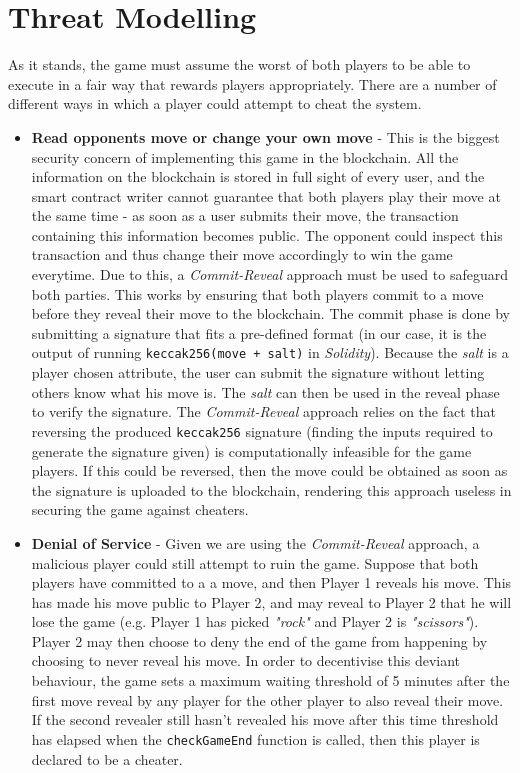 \documentclass[a4paper, twoside]{article}
\begin{document}
\section{Threat Modelling}

As it stands, the game must assume the worst of both players to be able to execute in a fair way that rewards players appropriately. There are a number of different ways in which a player could attempt to cheat the system.

\begin{itemize}
	\item \textbf{Read opponents move or change your own move} - This is the biggest security concern of implementing this game in the blockchain. All the information on the blockchain is stored in full sight of every user, and the smart contract writer cannot guarantee that both players play their move at the same time - as soon as a user submits their move, the transaction containing this information becomes public. The opponent could inspect this transaction and thus change their move accordingly to win the game everytime. Due to this, a \textit{Commit-Reveal} approach must be used to safeguard both parties. This works by ensuring that both players commit to a move before they reveal their move to the blockchain. The commit phase is done by submitting a signature that fits a pre-defined format (in our case, it is the output of running \texttt{keccak256(move + salt)} in \textit{Solidity}). Because the \textit{salt} is a player chosen attribute, the user can submit the signature without letting others know what his move is. The \textit{salt} can then be used in the reveal phase to verify the signature. The \textit{Commit-Reveal} approach relies on the fact that reversing the produced \texttt{keccak256} signature (finding the inputs required to generate the signature given) is computationally infeasible for the game players. If this could be reversed, then the move could be obtained as soon as the signature is uploaded to the blockchain, rendering this approach useless in securing the game against cheaters.
	
	\item \textbf{Denial of Service} - Given we are using the \textit{Commit-Reveal} approach, a malicious player could still attempt to ruin the game. Suppose that both players have committed to a a move, and then Player 1 reveals his move. This has made his move public to Player 2, and may reveal to Player 2 that he will lose the game (e.g. Player 1 has picked \textit{"rock"} and Player 2 is \textit{"scissors"}). Player 2 may then choose to deny the end of the game from happening by choosing to never reveal his move. In order to decentivise this deviant behaviour, the game sets a maximum waiting threshold of 5 minutes after the first move reveal by any player for the other player to also reveal their move. If the second revealer still hasn't revealed his move after this time threshold has elapsed when the \texttt{checkGameEnd} function is called, then this player is declared to be a cheater.
	

\end{itemize}
\end{document}
